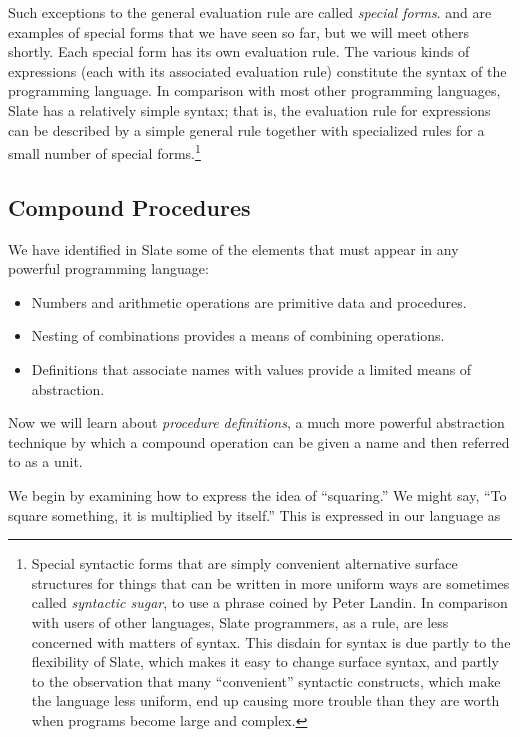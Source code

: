 Such exceptions to the general evaluation rule are called \textit{special forms}.  and  are examples of special forms that we have seen so far, but we will meet others shortly. Each special form has its own evaluation rule. The various kinds of expressions (each with its associated evaluation rule) constitute the syntax of the programming language. In comparison with most other programming languages, Slate has a relatively simple syntax; that is, the evaluation rule for expressions can be described by a simple general rule together with specialized rules for a small number of special forms.\footnote{Special syntactic forms that are simply convenient alternative surface structures for things that can be written in more uniform ways are sometimes called \textit{syntactic sugar}, to use a phrase coined by Peter Landin. In comparison with users of other languages, Slate programmers, as a rule, are less concerned with matters of syntax. This disdain for syntax is due partly to the flexibility of Slate, which makes it easy to change surface syntax, and partly to the observation that many ``convenient'' syntactic constructs, which make the language less uniform, end up causing more trouble than they are worth when programs become large and complex.}

\subsection{Compound Procedures}

We have identified in Slate some of the elements that must appear in any powerful programming language:

\begin{itemize}
\item Numbers and arithmetic operations are primitive data and procedures.
\item Nesting of combinations provides a means of combining operations.
\item Definitions that associate names with values provide a limited means of abstraction.
\end{itemize}

Now we will learn about \textit{procedure definitions}, a much more powerful abstraction technique by which a compound operation can be given a name and then referred to as a unit.

We begin by examining how to express the idea of ``squaring.'' We might say, ``To square something, it is multiplied by itself.'' This is expressed in our language as

